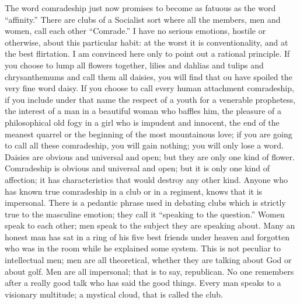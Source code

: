 \documentclass{book}
\begin{document}
The word comradeship just now promises to become as fatuous as the word “affinity.” There are clubs of a Socialist sort where all the members, men and women, call each other “Comrade.” I have no serious emotions, hostile or otherwise, about this particular habit: at the worst it is conventionality, and at the best flirtation. I am convinced here only to point out a rational principle. If you choose to lump all flowers together, lilies and dahlias and tulips and chrysanthemums and call them all daisies, you will find that ou have spoiled the very fine word daisy. If you choose to call every human attachment comradeship, if you include under that name the respect of a youth for a venerable prophetess, the interest of a man in a beautiful woman who baffles him, the pleasure of a philosophical old fogy in a girl who is impudent and innocent, the end of the meanest quarrel or the beginning of the most mountainous love; if you are going to call all these comradeship, you will gain nothing; you will only lose a word. Daisies are obvious and universal and open; but they are only one kind of flower. Comradeship is obvious and universal and open; but it is only one kind of affection; it has characteristics that would destroy any other kind. Anyone who has known true comradeship in a club or in a regiment, knows that it is impersonal. There is a pedantic phrase used in debating clubs which is strictly true to the masculine emotion; they call it “speaking to the question.” Women speak to each other; men speak to the subject they are speaking about. Many an honest man has sat in a ring of his five best friends under heaven and forgotten who was in the room while he explained some system. This is not peculiar to intellectual men; men are all theoretical, whether they are talking about God or about golf. Men are all impersonal; that is to say, republican. No one remembers after a really good talk who has said the good things. Every man speaks to a visionary multitude; a mystical cloud, that is called the club.
\end{document}
